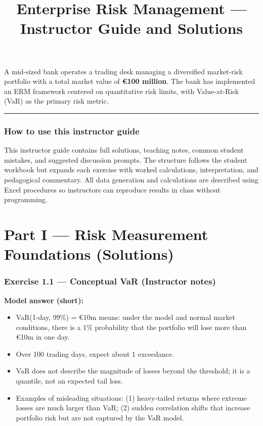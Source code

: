 \documentclass[11pt]{article}
\title{\textbf{Enterprise Risk Management --- Instructor Guide and Solutions}}
\author{}
\date{}
\begin{document}
\maketitle

A mid-sized bank operates a trading desk managing a diversified market-risk portfolio with a total market value of \textbf{€100 million}. The bank has implemented an ERM framework centered on quantitative risk limits, with Value-at-Risk (VaR) as the primary risk metric.

\bigskip
\hrule
\bigskip

\section*{How to use this instructor guide}
This instructor guide contains full solutions, teaching notes, common student mistakes, and suggested discussion prompts. The structure follows the student workbook but expands each exercise with worked calculations, interpretation, and pedagogical commentary. All data generation and calculations are described using Excel procedures so instructors can reproduce results in class without programming.

\newpage
\part*{Part I --- Risk Measurement Foundations (Solutions)}

\section{Exercise 1.1 --- Conceptual VaR (Instructor notes)}
\textbf{Model answer (short):}
\begin{itemize}
  \item VaR(1-day, 99\%) = \euro 10m means: under the model and normal market conditions, there is a 1\% probability that the portfolio will lose more than \euro 10m in one day.
  \item Over 100 trading days, expect about 1 exceedance.
  \item VaR does not describe the magnitude of losses beyond the threshold; it is a quantile, not an expected tail loss.
  \item Examples of misleading situations: (1) heavy-tailed returns where extreme losses are much larger than VaR; (2) sudden correlation shifts that increase portfolio risk but are not captured by the VaR model.
\end{itemize}
\end{document}
